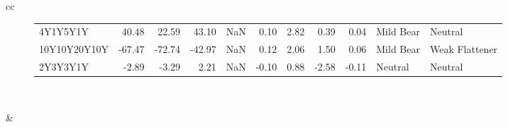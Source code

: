 \documentclass[a4paper,twoside]{report}
\begin{document}
\begin{figure}[htbp]
\begin{tabular}[c]{cc}
\begin{subfigure}[c]{0.5\textwidth}
\begin{adjustbox}{max width=\textwidth}
\begin{tabular}{lrrrrrrrrll}
     4Y1Y5Y1Y &   40.48 &    22.59 &     43.10 &    NaN &  0.10 &      2.82 &   0.39 &     0.04 &    Mild Bear &         Neutral \\
 10Y10Y20Y10Y &  -67.47 &   -72.74 &    -42.97 &    NaN &  0.12 &      2.06 &   1.50 &     0.06 &    Mild Bear &  Weak Flattener \\
     2Y3Y3Y1Y &   -2.89 &    -3.29 &      2.21 &    NaN & -0.10 &      0.88 &  -2.58 &    -0.11 &      Neutral &         Neutral \\
\hline
\end{tabular}
\end{adjustbox}
\end{subfigure}\\
 
 

\begin{subfigure}[c]{0.5\textwidth}
 
 \null\hfill 
 \end{subfigure}&
 

\end{tabular}
\end{figure}
\end{document}
